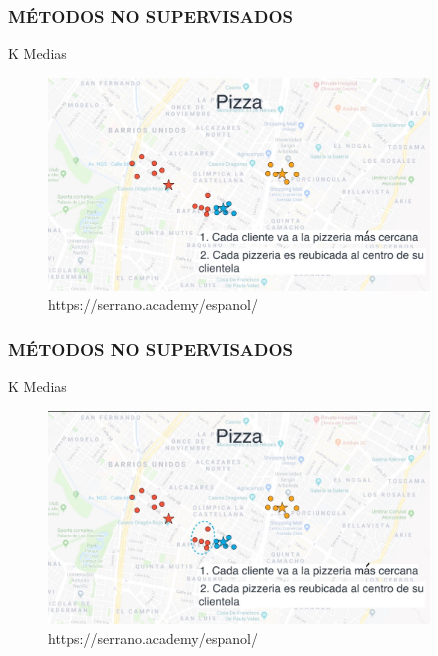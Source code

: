 \documentclass{beamer}
\begin{document}
\begin{frame}
	\frametitle{MÉTODOS NO SUPERVISADOS}
	\begin{block}{K Medias}	
		\begin{figure}
			\includegraphics[width=0.9\textwidth]{Imagenes_k_means/IMG_3517.jpg}
			\caption{https://serrano.academy/espanol/}
		\end{figure}
	\end{block}
\end{frame}


\begin{frame}
	\frametitle{MÉTODOS NO SUPERVISADOS}
	\begin{block}{K Medias}	
		\begin{figure}
			\includegraphics[width=0.9\textwidth]{Imagenes_k_means/IMG_3518.jpg}
			\caption{https://serrano.academy/espanol/}
		\end{figure}
	\end{block}
\end{frame}
\end{document}
